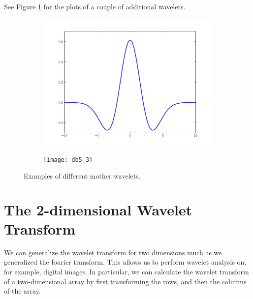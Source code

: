 See Figure \ref{fig:more_wavelets} for the plots of a couple of additional wavelets.
\begin{figure}[H]
\begin{subfigure}[b]{0.45\textwidth}
    \includegraphics[width=\textwidth]{mexicanHat}
\end{subfigure}
\begin{subfigure}[b]{0.45\textwidth}
    \texttt{[image: db5\_3]}
\end{subfigure}
\caption{Examples of different mother wavelets.}
\label{fig:more_wavelets}
\end{figure}

\section*{The 2-dimensional Wavelet Transform}
We can generalize the wavelet transform for two dimensions much as we generalized the fourier transform.
This allows us to perform wavelet analysis on, for example, digital images.
In particular, we can calculate the wavelet transform of a two-dimensional
array  by first transforming the rows, and then the columns of the array.

